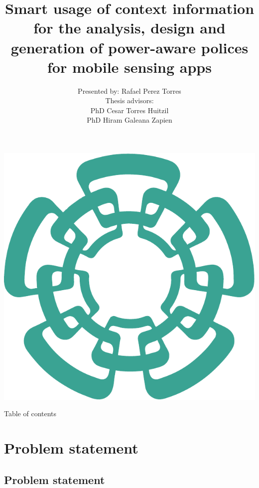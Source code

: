 \documentclass[compress,9pt,xcolor={dvipsnames,table}]{beamer}
\title[Smart usage of context information for the analysis, design and generation of power-aware polices for mobile sensing apps]{ Smart usage of context information for the analysis, design and generation of power-aware polices for mobile sensing apps}
\author[Rafael Perez Torres]{Presented by: Rafael Perez Torres\\[0.5cm] Thesis advisors:\\PhD Cesar Torres Huitzil\\PhD Hiram Galeana Zapien}
\institute{Cinvestav Tamaulipas}
\date{}
\begin{document}
\begin{frame}[plain]
  \begin{center}
  \includegraphics[scale=0.12]{../../../resources/images/vectors/cinvestav-logo-no-text}
  \end{center}
  \titlepage
  
\end{frame}


\begin{frame}{Table of contents}
	\tableofcontents[hideallsubsections]
\end{frame}

\section{Problem statement}
\subsection{Problem statement}
\end{document}
